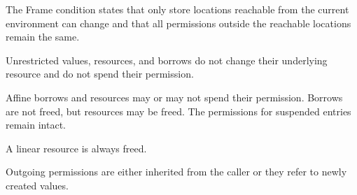 The Frame condition states that only store locations reachable from
the current environment can change and that all permissions outside
the reachable locations remain the same.

Unrestricted values, resources, and borrows do not change their
underlying resource and do not spend their permission.

Affine borrows and resources may or may not spend their
permission. Borrows are not freed, but resources may be freed. The
permissions for suspended entries remain intact.


A linear resource is always freed.

Outgoing permissions are either inherited from the caller or they
refer to newly created values.



